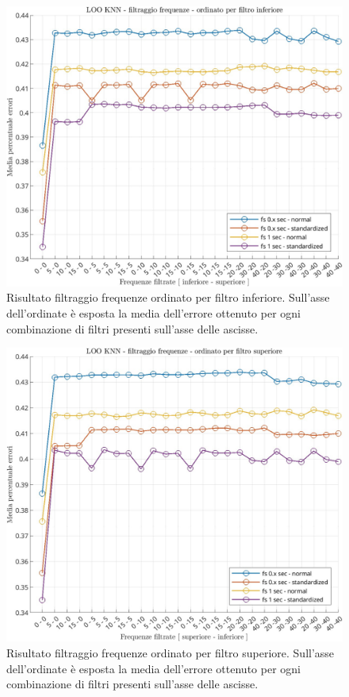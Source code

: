 \begin{center}	
	\begin{figure}[htp]
		\centering
		\includegraphics[width=1\textwidth]{img/cap4-filtraggio1.jpg}
		\caption{Risultato filtraggio frequenze ordinato per filtro inferiore. Sull'asse dell'ordinate è esposta la media dell'errore ottenuto per ogni combinazione di filtri presenti sull'asse delle ascisse.}
		\label{fig4.1}
	\end{figure}
\end{center}	
\begin{center}	
	\begin{figure}[htp]
		\centering
		\includegraphics[width=1\textwidth]{img/cap4-filtraggio2.jpg}
		\caption{Risultato filtraggio frequenze ordinato per filtro superiore. Sull'asse dell'ordinate è esposta la media dell'errore ottenuto per ogni combinazione di filtri presenti sull'asse delle ascisse.}
		\label{fig4.2}
	\end{figure}
\end{center}	

